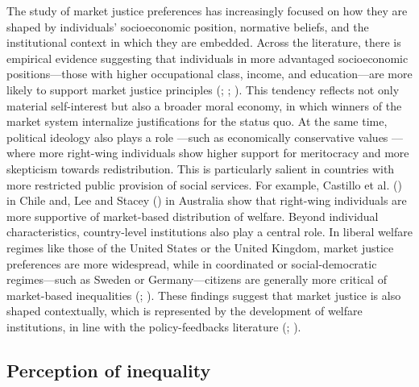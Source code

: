 \documentclass[
  12pt,
]{article}
\begin{document}
The study of market justice preferences has increasingly focused on how
they are shaped by individuals' socioeconomic position, normative
beliefs, and the institutional context in which they are embedded.
Across the literature, there is empirical evidence suggesting that
individuals in more advantaged socioeconomic positions---those with
higher occupational class, income, and education---are more likely to
support market justice principles (; ;
). This tendency
reflects not only material self-interest but also a broader moral
economy, in which winners of the market system internalize
justifications for the status quo. At the same time, political ideology
also plays a role ---such as economically conservative values --- where
more right-wing individuals show higher support for meritocracy and more
skepticism towards redistribution. This is particularly salient in
countries with more restricted public provision of social services. For
example, Castillo et al.
() in Chile and, Lee and
Stacey () in Australia show that
right-wing individuals are more supportive of market-based distribution
of welfare. Beyond individual characteristics, country-level
institutions also play a central role. In liberal welfare regimes like
those of the United States or the United Kingdom, market justice
preferences are more widespread, while in coordinated or
social-democratic regimes---such as Sweden or Germany---citizens are
generally more critical of market-based inequalities
(;
). These findings suggest
that market justice is also shaped contextually, which is represented by
the development of welfare institutions, in line with the
policy-feedbacks literature
(;
).

\subsection{Perception of inequality}\label{perception-of-inequality}
\end{document}
